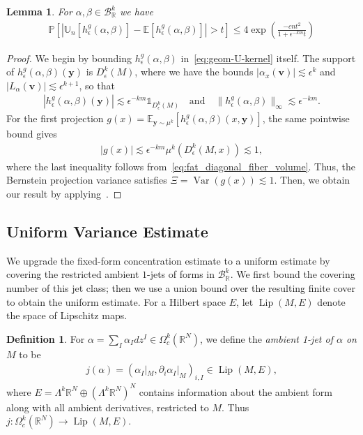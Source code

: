 \documentclass[11pt,reqno]{amsproc}
\numberwithin{equation}{section}
\newcommand{\R}{\mathbb{R}}
\newcommand{\E}{\mathbb{E}}
\newcommand{\U}{\mathbb{U}}
\newcommand{\PP}{\mathbb{P}}
\newcommand{\one}{\mathbb{1}}
\newcommand{\by}{\mathbf{y}}
\newcommand{\bv}{\mathbf{v}}
\newcommand{\cB}{\mathcal{B}}
\newcommand{\ls}{\lesssim}
\newcommand{\Var}{\operatorname{Var}}
\newcommand{\Lip}{\operatorname{Lip}}
\newtheorem{lemma}[counter]{Lemma}
\newcommand{\andd}{\quad \text{and} \quad}
\theoremstyle{definition}
\newtheorem{definition}[counter]{Definition}
\theoremstyle{plain}
\begin{document}
    \begin{lemma} \label{lem:geokernel-variance-tail}
        For $\alpha, \beta \in \cB_\R^k$ we have 
        \begin{align}
            \PP\left[\left| \U_n[h^g_\epsilon(\alpha, \beta)] - \E[h^g_\epsilon(\alpha, \beta)]\right|  > t\right] \leq 4\exp\left(\frac{-cn t^2}{1 + \epsilon^{-km}t}\right)
        \end{align}
    \end{lemma}
    \begin{proof}
    We begin by bounding $h^g_\epsilon(\alpha, \beta)$ in~\eqref{eq:geom-U-kernel} itself. The support of $h^g_\epsilon(\alpha, \beta)(\by)$ is $D^k_\epsilon(M)$, where we have the bounds $|\alpha_x(\bv)| \ls \epsilon^k$ and $|L_\alpha(\bv)| \ls \epsilon^{k+1}$, so that
    \begin{align}
        |h^g_\epsilon(\alpha, \beta)(\by)| \ls \epsilon^{-km} \one_{D^k_\epsilon(M)} \andd \|h^g_\epsilon(\alpha, \beta)\|_\infty \ls \epsilon^{-km}.
    \end{align}
    For the first projection $g(x)=\E_{\by\sim\mu^k}[h^g_\epsilon(\alpha,\beta)(x,\by)]$, the same pointwise bound gives
    \begin{align}
        |g(x)| \ls \epsilon^{-km}\mu^k(D^k_\epsilon(M,x)) \ls 1,
    \end{align}
    where the last inequality follows from~\eqref{eq:fat_diagonal_fiber_volume}. Thus, the Bernstein projection variance satisfies $\Xi=\Var(g(x))\ls 1$. Then, we obtain our result by applying~.

    \end{proof}


    \subsection{Uniform Variance Estimate} \label{ssec:uc_uniform_variance}

    We upgrade the fixed-form concentration estimate to a uniform estimate by covering the restricted ambient $1$-jets of forms in $\cB^k_\R$. We first bound the covering number of this jet class; then we use a union bound over the resulting finite cover to obtain the uniform estimate. For a Hilbert space $E$, let $\Lip(M,E)$ denote the space of Lipschitz maps.

    \begin{definition} \label{def:ambient_one_jet}
        For $\alpha = \sum_I \alpha_I dz^I \in \Omega^k_c(\R^N)$, we define the \emph{ambient 1-jet of $\alpha$ on $M$} to be
        \begin{align}
            j(\alpha) = (\alpha_I|_M, \partial_i \alpha_I|_M)_{i,I} \in \Lip(M, E),
        \end{align}
        where $E = \Lambda^k \R^N \oplus (\Lambda^k \R^N)^N$ contains information about the ambient form along with all ambient derivatives, restricted to $M$. Thus $j: \Omega^k_c(\R^N) \to \Lip(M, E)$. 
    \end{definition}
\end{document}
